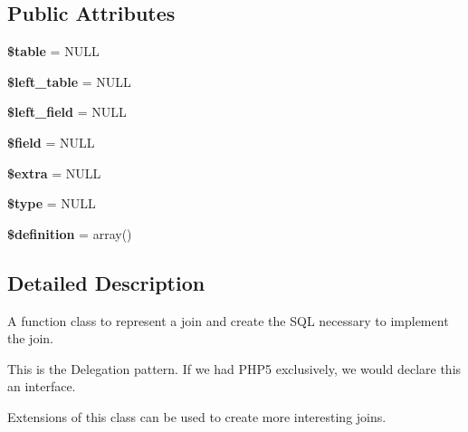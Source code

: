 \subsection*{Public Attributes}
\begin{DoxyCompactItemize}
\item 
\hypertarget{classviews__join_a3742509dacc4845782941a98e8d61081}{
{\bfseries \$table} = NULL}
\label{classviews__join_a3742509dacc4845782941a98e8d61081}

\item 
\hypertarget{classviews__join_aa7e157f76dd5fb2dd4978da176e73590}{
{\bfseries \$left\_\-table} = NULL}
\label{classviews__join_aa7e157f76dd5fb2dd4978da176e73590}

\item 
\hypertarget{classviews__join_a2f3845bc17cf97ea44c231c1a09e4eed}{
{\bfseries \$left\_\-field} = NULL}
\label{classviews__join_a2f3845bc17cf97ea44c231c1a09e4eed}

\item 
\hypertarget{classviews__join_ac81c9ca972a9ef48c510cea68740c31c}{
{\bfseries \$field} = NULL}
\label{classviews__join_ac81c9ca972a9ef48c510cea68740c31c}

\item 
\hypertarget{classviews__join_ad758194037de42d15da5bee5327d5487}{
{\bfseries \$extra} = NULL}
\label{classviews__join_ad758194037de42d15da5bee5327d5487}

\item 
\hypertarget{classviews__join_a30121a6713f1a5bee6bf978032a4afcc}{
{\bfseries \$type} = NULL}
\label{classviews__join_a30121a6713f1a5bee6bf978032a4afcc}

\item 
\hypertarget{classviews__join_a0a3762d125ca651d92ea488f878af30b}{
{\bfseries \$definition} = array()}
\label{classviews__join_a0a3762d125ca651d92ea488f878af30b}

\end{DoxyCompactItemize}


\subsection{Detailed Description}
A function class to represent a join and create the SQL necessary to implement the join.

This is the Delegation pattern. If we had PHP5 exclusively, we would declare this an interface.

Extensions of this class can be used to create more interesting joins.

